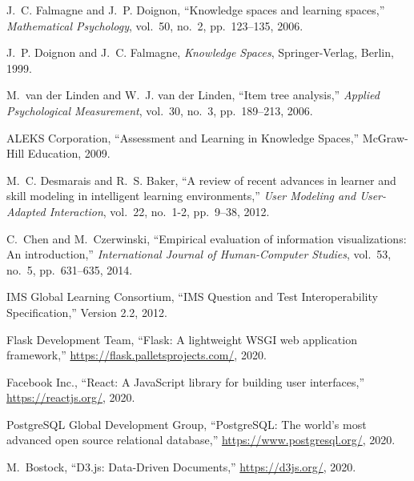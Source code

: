 \documentclass[conference]{IEEEtran}
\begin{document}
\begin{thebibliography}{1}

J.~C. Falmagne and J.~P. Doignon,
\newblock ``Knowledge spaces and learning spaces,''
\newblock \emph{Mathematical Psychology}, vol.~50, no.~2, pp.~123--135, 2006.

J.~P. Doignon and J.~C. Falmagne,
\newblock \emph{Knowledge Spaces},
\newblock Springer-Verlag, Berlin, 1999.

M.~van der Linden and W.~J. van der Linden,
\newblock ``Item tree analysis,''
\newblock \emph{Applied Psychological Measurement}, vol.~30, no.~3, pp.~189--213, 2006.

ALEKS Corporation,
\newblock ``Assessment and Learning in Knowledge Spaces,''
\newblock McGraw-Hill Education, 2009.

M.~C. Desmarais and R.~S. Baker,
\newblock ``A review of recent advances in learner and skill modeling in intelligent learning environments,''
\newblock \emph{User Modeling and User-Adapted Interaction}, vol.~22, no.~1-2, pp.~9--38, 2012.

C.~Chen and M.~Czerwinski,
\newblock ``Empirical evaluation of information visualizations: An introduction,''
\newblock \emph{International Journal of Human-Computer Studies}, vol.~53, no.~5, pp.~631--635, 2014.

IMS Global Learning Consortium,
\newblock ``IMS Question and Test Interoperability Specification,''
\newblock Version 2.2, 2012.

Flask Development Team,
\newblock ``Flask: A lightweight WSGI web application framework,''
\newblock \url{https://flask.palletsprojects.com/}, 2020.

Facebook Inc.,
\newblock ``React: A JavaScript library for building user interfaces,''
\newblock \url{https://reactjs.org/}, 2020.

PostgreSQL Global Development Group,
\newblock ``PostgreSQL: The world's most advanced open source relational database,''
\newblock \url{https://www.postgresql.org/}, 2020.

M.~Bostock,
\newblock ``D3.js: Data-Driven Documents,''
\newblock \url{https://d3js.org/}, 2020.

\end{thebibliography}
\end{document}
